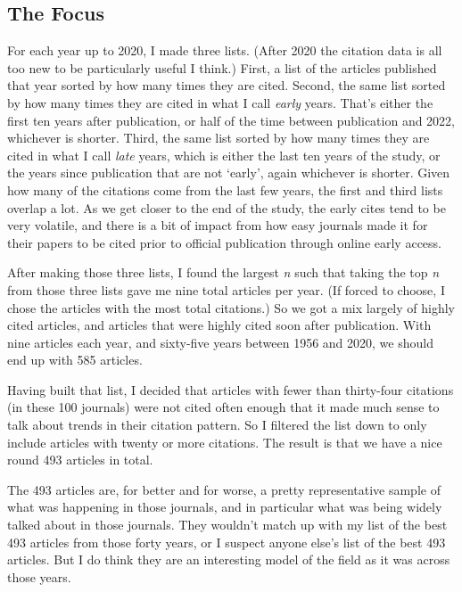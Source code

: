 \documentclass[
  10pt,
  letterpaper,
  DIV=11,
  numbers=noendperiod,
  twoside]{scrartcl}
\begin{document}
\subsection{The Focus}\label{sec-focus}

For each year up to 2020, I made three lists. (After 2020 the citation
data is all too new to be particularly useful I think.) First, a list of
the articles published that year sorted by how many times they are
cited. Second, the same list sorted by how many times they are cited in
what I call \emph{early} years. That's either the first ten years after
publication, or half of the time between publication and 2022, whichever
is shorter. Third, the same list sorted by how many times they are cited
in what I call \emph{late} years, which is either the last ten years of
the study, or the years since publication that are not `early', again
whichever is shorter. Given how many of the citations come from the last
few years, the first and third lists overlap a lot. As we get closer to
the end of the study, the early cites tend to be very volatile, and
there is a bit of impact from how easy journals made it for their papers
to be cited prior to official publication through online early access.

After making those three lists, I found the largest \emph{n} such that
taking the top \emph{n} from those three lists gave me nine total
articles per year. (If forced to choose, I chose the articles with the
most total citations.) So we got a mix largely of highly cited articles,
and articles that were highly cited soon after publication. With nine
articles each year, and sixty-five years between 1956 and 2020, we
should end up with 585 articles.

Having built that list, I decided that articles with fewer than
thirty-four citations (in these 100 journals) were not cited often
enough that it made much sense to talk about trends in their citation
pattern. So I filtered the list down to only include articles with
twenty or more citations. The result is that we have a nice round 493
articles in total.

The 493 articles are, for better and for worse, a pretty representative
sample of what was happening in those journals, and in particular what
was being widely talked about in those journals. They wouldn't match up
with my list of the best 493 articles from those forty years, or I
suspect anyone else's list of the best 493 articles. But I do think they
are an interesting model of the field as it was across those years.
\end{document}
